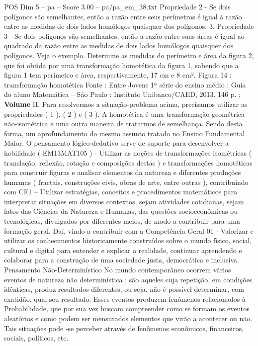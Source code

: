 \begin{textsample}{POS Dim 5 – pa – Score 3.00 – pa/pa\_em\_38.txt}
Propriedade 2 - Se dois polígonos são semelhantes, então a razão entre seus perímetros é igual à razão entre as medidas de dois lados homólogos quaisquer dos polígonos. 3.
Propriedade 3 - Se dois polígonos são semelhantes, então a razão entre suas áreas é igual ao quadrado da razão entre as medidas de dois lados homólogos quaisquer dos polígonos.
Veja o exemplo.
Determine as medidas do perímetro e área da figura 2, que foi obtida por uma transformação homotética da figura 1, sabendo que a figura 1 tem perímetro e área, respectivamente, 17 cm e 8 cm².
Figura 14 : transformação homotética Fonte : Entre Jovens 1ª série do ensino médio : Guia do aluno Matemática – São Paulo : Instituto Unibanco/CAED, 2013. 146 p. ; \textbf{Volume} II.
Para resolvermos a situação-problema acima, precisamos utilizar as propriedades ( 1 ), ( 2 ) e ( 3 ).
A homotética é uma transformação geométrica não-isométrica e uma outra maneira de tratarmos de semelhança.
Sendo desta forma, um aprofundamento do mesmo assunto tratado no Ensino Fundamental Maior.
O pensamento lógico-dedutivo serve de suporte para desenvolver a habilidade ( EM13MAT105 ) - Utilizar as noções de transformações isométricas ( translação, reflexão, rotação e composições destas ) e transformações homotéticas para construir figuras e analisar elementos da natureza e diferentes produções humanas ( fractais, construções civis, obras de arte, entre outras ), contribuindo com CE1 – Utilizar estratégias, conceitos e procedimentos matemáticos para interpretar situações em diversos contextos, sejam atividades cotidianas, sejam fatos das Ciências da Natureza e Humanas, das questões socioeconômicas ou tecnológicas, divulgados por diferentes meios, de modo a contribuir para uma formação geral.
Daí, vindo a contribuir com a Competência Geral 01 - Valorizar e utilizar os conhecimentos historicamente construídos sobre o mundo físico, social, cultural e digital para entender e explicar a realidade, continuar aprendendo e colaborar para a construção de uma sociedade justa, democrática e inclusiva.
Pensamento Não-Determinístico No mundo contemporâneo ocorrem vários eventos de natureza não determinística ; são aqueles cuja repetição, em condições idênticas, produz resultados diferentes, ou seja, não é possível determinar, com exatidão, qual seu resultado.
Esses eventos produzem fenômenos relacionados à Probabilidade, que por sua vez buscam compreender como se formam os eventos aleatórios e como podem ser mensurados elementos que virão a acontecer ou não.
Tais situações pode -se perceber através de fenômenos econômicos, financeiros, sociais, políticos, etc.

\end{textsample}
